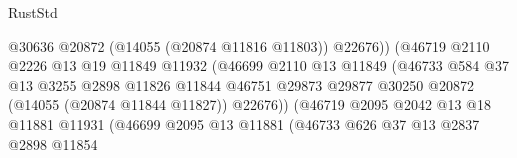 \begin{lexlean}{RustStd}
\begin{coremodule}
                                              @30636
                                              @20872
                                              (@14055 (@20874 @11816 @11803))
                                              @22676))
                                          (@46719
                                            @2110
                                            @2226
                                            @13
                                            @19
                                            @11849
                                            @11932
                                            (@46699
                                              @2110
                                              @13
                                              @11849
                                              (@46733
                                                @584
                                                @37
                                                @13
                                                @3255
                                                @2898
                                                @11826
                                                @11844
                                                @46751
                                                @29873
                                                @29877
                                                @30250
                                                @20872
                                                (@14055 (@20874 @11844 @11827))
                                                @22676))
                                            (@46719
                                              @2095
                                              @2042
                                              @13
                                              @18
                                              @11881
                                              @11931
                                              (@46699
                                                @2095
                                                @13
                                                @11881
                                                (@46733
                                                  @626
                                                  @37
                                                  @13
                                                  @2837
                                                  @2898
                                                  @11854

\end{coremodule}
\end{lexlean}

